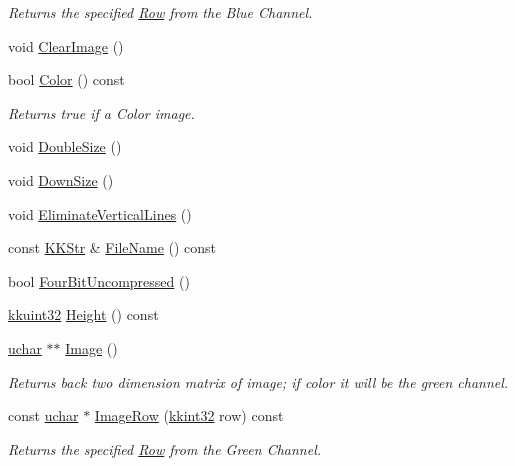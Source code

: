 \begin{DoxyCompactItemize}
\begin{DoxyCompactList}\small\item\em Returns the specified \hyperlink{class_k_k_b_1_1_row}{Row} from the Blue Channel. \end{DoxyCompactList}\item 
void \hyperlink{class_k_k_b_1_1_bmp_image_a114cdc4a156e8a1425afd8d16bf30cfe}{Clear\+Image} ()
\item 
bool \hyperlink{class_k_k_b_1_1_bmp_image_ada730c1253be818b247e711665b0114b}{Color} () const 
\begin{DoxyCompactList}\small\item\em Returns true if a Color image. \end{DoxyCompactList}\item 
void \hyperlink{class_k_k_b_1_1_bmp_image_a355c29ac18b346f1ded3adaa95b20bcb}{Double\+Size} ()
\item 
void \hyperlink{class_k_k_b_1_1_bmp_image_af3a143d6c740df57a5b79945d027b443}{Down\+Size} ()
\item 
void \hyperlink{class_k_k_b_1_1_bmp_image_a182bbf22f3eb361e669073617172d2a7}{Eliminate\+Vertical\+Lines} ()
\item 
const \hyperlink{class_k_k_b_1_1_k_k_str}{K\+K\+Str} \& \hyperlink{class_k_k_b_1_1_bmp_image_a59ed1f99c1554aa3b12b3a90195d9b51}{File\+Name} () const 
\item 
bool \hyperlink{class_k_k_b_1_1_bmp_image_a5b290fe260379e4665b5d5e2261175cf}{Four\+Bit\+Uncompressed} ()
\item 
\hyperlink{namespace_k_k_b_af8d832f05c54994a1cce25bd5743e19a}{kkuint32} \hyperlink{class_k_k_b_1_1_bmp_image_ae9a8a8f35af1c7d4b2fabbea4b92cc23}{Height} () const 
\item 
\hyperlink{namespace_k_k_b_ace9969169bf514f9ee6185186949cdf7}{uchar} $\ast$$\ast$ \hyperlink{class_k_k_b_1_1_bmp_image_a122d01d6b6996cd9b0df01e856746234}{Image} ()
\begin{DoxyCompactList}\small\item\em Returns back two dimension matrix of image; if color it will be the green channel. \end{DoxyCompactList}\item 
const \hyperlink{namespace_k_k_b_ace9969169bf514f9ee6185186949cdf7}{uchar} $\ast$ \hyperlink{class_k_k_b_1_1_bmp_image_ab0d6fac104e1b68ac72e4c7b57dc5ead}{Image\+Row} (\hyperlink{namespace_k_k_b_a8fa4952cc84fda1de4bec1fbdd8d5b1b}{kkint32} row) const 
\begin{DoxyCompactList}\small\item\em Returns the specified \hyperlink{class_k_k_b_1_1_row}{Row} from the Green Channel. \end{DoxyCompactList}\item 
$$
\end{DoxyCompactItemize}
